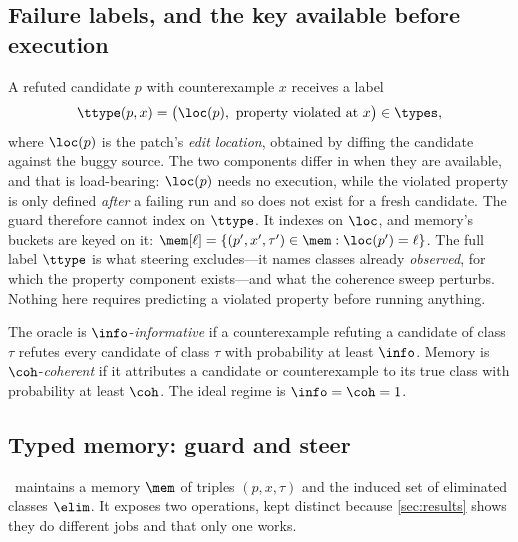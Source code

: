\subsection{Failure labels, and the key available before execution}
A refuted candidate $p$ with counterexample $x$ receives a label
\begin{equation}
\ttype(p, x) = \big(\loc(p),\ \text{property violated at } x\big) \in \types ,
\label{eq:type}
\end{equation}
where $\loc(p)$ is the patch's \emph{edit location}, obtained by diffing the
candidate against the buggy source. The two components differ in when they are
available, and that is load-bearing: $\loc(p)$ needs no execution, while the
violated property is only defined \emph{after} a failing run and so does not
exist for a fresh candidate. The guard therefore cannot index on $\ttype$. It
indexes on $\loc$, and memory's buckets are keyed on it:
$\mem[\ell] = \{(p', x', \tau') \in \mem : \loc(p') = \ell\}$. The full label
$\ttype$ is what steering excludes---it names classes already \emph{observed},
for which the property component exists---and what the coherence sweep
perturbs. Nothing here requires predicting a violated property before running
anything.

\begin{definition}
\label{def:coh}
The oracle is $\info$-\emph{informative} if a counterexample refuting a
candidate of class $\tau$ refutes every candidate of class $\tau$ with
probability at least $\info$. Memory is $\coh$-\emph{coherent} if it attributes
a candidate or counterexample to its true class with probability at least
$\coh$. The ideal regime is $\info = \coh = 1$.
\end{definition}

\subsection{Typed memory: guard and steer}
\CEGMem\ maintains a memory $\mem$ of triples $(p, x, \tau)$ and the induced
set of eliminated classes $\elim$. It exposes two operations, kept distinct
because \cref{sec:results} shows they do different jobs and that only one
works.

